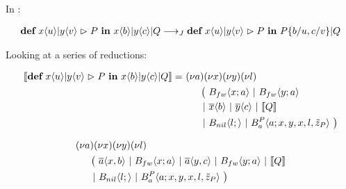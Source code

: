 
\vspace{1cm}

In \joincalc:

\begin{align*}
  \textbf{def} \ x\langle u\rangle | y\langle v\rangle \vartriangleright P \ \textbf{in} \ x\langle b\rangle | y\langle c\rangle | Q
  \longrightarrow_J
  \textbf{def} \ x\langle u\rangle | y\langle v\rangle \vartriangleright P \ \textbf{in} \ P\{ b / u,c / v \} | Q
\end{align*}

Looking at a series of reductions:

\begin{align*}
  \encMJtoAP{\jdef{\jrct{\jrcv{x}{u} \jpat \jrcv{y}{v}}{P}}{\jsnd{x}{b} \jpar \jsnd{y}{c} \jpar Q}}
  =\ &\anew{a}{\anew{x}{\anew{y}{\anew{l}{ \\
      &\hspace{0.5cm}
      \begin{aligned}[t]
        \big(\ &\ains{B_{fw}}{x}{a}
        \apar   \ains{B_{fw}}{y}{a} \\
        \apar  &\asnd{x}{b} \apar \asnd{y}{c} \apar \encMJtoAP{Q} \\
        \apar  &\ains{B_{nil}}{l}{}
        \apar   \ains{B_a^P}{a}{x, y, x, l, \tilde{z}_P}
        \ \big)
      \end{aligned}
    }}}}
\end{align*}


\begin{align*}
  &\anew{a}{\anew{x}{\anew{y}{\anew{l}{ \\
    &\hspace{0.5cm}
    \begin{aligned}[t]
      \big(\ &\asnd{a}{x,b}
      \apar   \ains{B_{fw}}{x}{a}
      \apar   \asnd{a}{y,c}
      \apar   \ains{B_{fw}}{y}{a}
      \apar   \encMJtoAP{Q} \\
      \apar  &\ains{B_{nil}}{l}{}
      \apar   \ains{B_a^P}{a}{x, y, x, l, \tilde{z}_P}
      \ \big)
    \end{aligned}
  }}}}
\end{align*}



